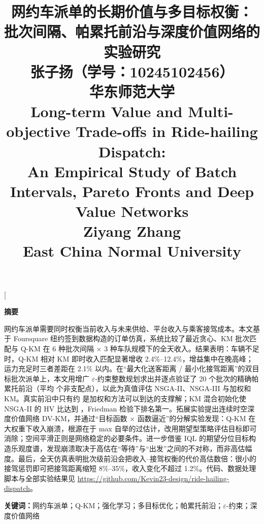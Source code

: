 \documentclass[twocolumn]{article}
\title{
	\textbf{网约车派单的长期价值与多目标权衡：\\批次间隔、帕累托前沿与深度价值网络的实验研究} \\
	\vspace{0.5em} \normalsize 张子扬\quad（学号：10245102456） \\
	{\small 华东师范大学} \\
	\vspace{1em}
	\large \textbf{Long-term Value and Multi-objective Trade-offs in Ride-hailing Dispatch:} \\
	\large \textbf{An Empirical Study of Batch Intervals, Pareto Fronts and Deep Value Networks} \\
	\vspace{0.5em} \normalsize Ziyang Zhang \\
	{\small East China Normal University}
}
\date{}
\begin{document}
\twocolumn[
\maketitle
\begin{minipage}{\textwidth}
	\centering
	{\noindent \textbf{\large 摘要}}
	\vspace{0.5em}
\end{minipage}
\begin{minipage}{1\textwidth}
	\setlength{\parindent}{2em}
	\indent 网约车派单需要同时权衡当前收入与未来供给、平台收入与乘客接驾成本。本文基于 Foursquare 纽约签到数据构造的订单仿真，系统比较了最近贪心、KM 批次匹配与 Q-KM 在 6 种批次间隔 × 3 种车队规模下的全天收入。结果表明：车辆不足时，Q-KM 相对 KM 即时收入匹配显著增收 2.4\%–12.4\%，增益集中在晚高峰；运力充足时三者差距在 2.1\% 以内。在“最大化送客距离 / 最小化接驾距离”的双目标批次派单上，本文用增广 $\varepsilon$-约束整数规划求出并逐点验证了 20 个批次的精确帕累托前沿（平均 \nexact 个非支配点），以此为真值评估 NSGA-II、NSGA-III 与加权和 KM。真实前沿中只有约 \supfrac 是加权和方法可以到达的支撑解；KM 混合初始化使 NSGA-II 的 HV 比达到 \hvinit，Friedman 检验下排名第一。拓展实验提出连续时空深度价值网络 DV-KM，并通过“目标函数 × 函数逼近”的分解实验发现：Q-KM 在大权重下收入崩溃，根源在于 max 自举的过估计，改用期望型策略评估目标即可消除；空间平滑正则是网络稳定的必要条件。进一步借鉴 IQL 的期望分位目标构造乐观度谱，发现崩溃取决于高估在“等待”与“出发”之间的不对称，而非高估幅度。\HINDSIGHTABS 最后，全天仿真表明批次级前沿会把收入–接驾权衡的代价高估数倍：很小的接驾惩罚即可把接驾距离缩短 8\%–35\%，收入变化不超过 1.2\%。代码、数据处理脚本与全部实验结果见 \url{https://github.com/Kevin23-design/ride-hailing-dispatch}。
\end{minipage}
\vspace{0.6em}

{\noindent \textbf{关键词：}网约车派单；Q-KM；强化学习；多目标优化；帕累托前沿；$\varepsilon$-约束；深度价值网络}
\vspace{0.8em}
\end{document}
